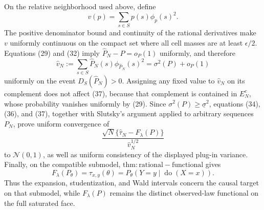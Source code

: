 On the relative neighborhood used above, define
\[
v(p)=\sum_{s\in S}p(s)\phi_p(s)^2.
\]
The positive denominator bound and continuity of the rational derivatives make \(v\) uniformly continuous on the compact set where all cell masses are at least \(\epsilon/2\).  Equations (29) and (32) imply \(\widehat P_N-P=o_P(1)\) uniformly, and therefore
\[
\widehat v_N
:=\sum_{s\in S}\widehat P_N(s)\phi_{\widehat P_N}(s)^2
=\sigma^2(P)+o_P(1)                                          \tag{37}
\]
uniformly on the event \(D_S(\widehat P_N)>0\).  Assigning any fixed value to \(\widehat v_N\) on its complement does not affect (37), because that complement is contained in \(E_N^c\), whose probability vanishes uniformly by (29).  Since \(\sigma^2(P)\ge\underline\sigma^2\), equations (34), (36), and (37), together with Slutsky's argument applied to arbitrary sequences \(P_N\), prove uniform convergence of
\[
\frac{\sqrt N\{\widehat\tau_N-F_\lambda(P)\}}
     {\widehat v_N^{1/2}}
\]
to \(\mathcal N(0,1)\), as well as uniform consistency of the displayed plug-in variance.  Finally, on the compatible submodel, \(\mathrm{thm:rational-functional}\) gives
\[
F_\lambda(P_\theta)=\tau_{x,y}(\theta)
=P_\theta(Y=y\mid\operatorname{do}(X=x)).
\]
Thus the expansion, studentization, and Wald intervals concern the causal target on that submodel, while \(F_\lambda(P)\) remains the distinct observed-law functional on the full saturated face.
